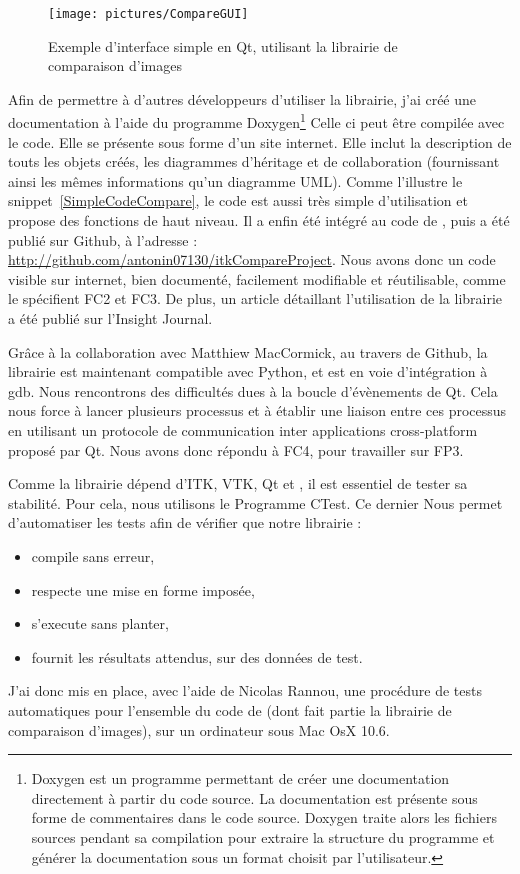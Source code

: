 \begin{figure}[h]
\begin{center}
\leavevmode
\texttt{[image: pictures/CompareGUI]}
\end{center}
\caption{Exemple d'interface simple en Qt, utilisant la librairie de comparaison d'images}
\label{fig:CompareGUI}
\end{figure}


Afin de permettre à d'autres développeurs d'utiliser la librairie,
j'ai créé une documentation à l'aide du programme Doxygen\footnote{Doxygen est un programme permettant de créer une documentation directement à partir du code source. La documentation est présente sous forme de commentaires dans le code source. Doxygen traite alors les fichiers sources pendant sa compilation pour extraire la structure du programme et générer la documentation sous un format choisit par l'utilisateur.} 
Celle ci peut être compilée avec le code.
Elle se présente sous forme d'un site internet.
Elle inclut la description de touts les objets créés, les diagrammes d'héritage et de collaboration
(fournissant ainsi les mêmes informations qu'un diagramme UML).
Comme l'illustre le snippet~\ref{SimpleCodeCompare}, le code est aussi très simple d'utilisation
et propose des fonctions de haut niveau.
Il a enfin été intégré au code de {\gofigure},
puis a été publié sur Github, à l'adresse :\\{\url{http://github.com/antonin07130/itkCompareProject}}.
Nous avons donc un code visible sur internet, bien documenté, facilement modifiable et réutilisable,
comme le spécifient FC2 et FC3.
De plus, un article\cite{AntoCompare} détaillant l'utilisation de la librairie a été publié sur l'Insight Journal.

Grâce à la collaboration avec Matthiew MacCormick, au travers de Github,
la librairie est maintenant compatible avec Python, et est en voie d'intégration à gdb.
Nous rencontrons des difficultés dues à la boucle d'évènements de Qt.
Cela nous force à lancer plusieurs processus et à établir une liaison entre
ces processus en utilisant un protocole de communication inter applications cross-platform proposé par Qt.
Nous avons donc répondu à FC4, pour travailler sur FP3.

Comme la librairie dépend d'ITK, VTK, Qt et {\gofigure}, il est essentiel de tester sa stabilité.
Pour cela, nous utilisons le Programme CTest.
Ce dernier Nous permet d'automatiser les tests afin de vérifier que notre librairie :
\begin{itemize}
  \item compile sans erreur,
  \item respecte une mise en forme imposée,
  \item s'execute sans planter,
  \item fournit les résultats attendus, sur des données de test.
\end{itemize}
J'ai donc mis en place, avec l'aide de Nicolas Rannou, une procédure de tests automatiques pour l'ensemble du code de {\gofigure} (dont fait partie la librairie de comparaison d'images), sur un ordinateur sous Mac OsX 10.6.


